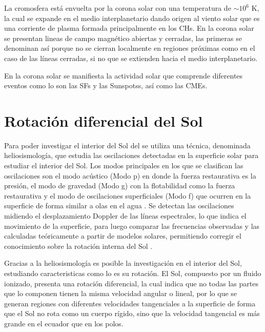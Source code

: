La cromosfera está envuelta por la corona solar con una temperatura de $\sim 10^{6}$ K, la cual se expande en el medio interplanetario dando origen al viento solar que es una corriente de plasma formada principalmente en los \acp{CH}. En la corona solar se presentan lineas de campo magnético abiertas y cerradas, las primeras se denominan así porque no se cierran localmente en regiones próximas como en el caso de las líneas cerradas, si no que se extienden hacia el medio interplanetario. 

En la corona solar se manifiesta la actividad solar que comprende diferentes eventos como lo son las \acsp{SF} \parencite[e.g.,][]{1969ARA&A...7..149S, schrijver-2008} y las \acsp{Sunspots}, así como las CMEs.

\section{Rotación diferencial del Sol}

Para poder investigar el interior del Sol del se utiliza una técnica, denominada heliosismología, que estudia las oscilaciones detectadas en la superficie solar para estudiar el interior del Sol. Los modos principales en los que se clasifican las oscilaciones son el modo acústico (Modo p) en donde la fuerza restaurativa es la presión, el modo de gravedad (Modo g) con la flotabilidad como la fuerza restaurativa y el modo de oscilaciones superficiales (Modo f) que ocurren en la superficie de forma similar a olas en el agua \parencite[e.g.,][]{thompson-2004}. Se detectan las oscilaciones midiendo el desplazamiento Doppler de las líneas espectrales, lo que indica el movimiento de la superficie, para luego comparar las frecuencias observadas y las calculadas teóricamente a partir de modelos solares, permitiendo corregir el conocimiento sobre la rotación interna del Sol \parencite[e.g.,][]{christensen-dalsgaard-2002}.

Gracias a la heliosismología es posible la investigación en el interior del Sol, estudiando caracteristicas como lo es su rotación. El Sol, compuesto por un fluido ionizado, presenta una rotación diferencial, la cual indica que no todas las partes que lo componen tienen la misma velocidad angular o lineal, por lo que se generan regiones con diferentes velocidades tangenciales a la superficie de forma que el Sol no rota como un cuerpo rígido, sino que la velocidad tangencial es más grande en el ecuador que en los polos. 


